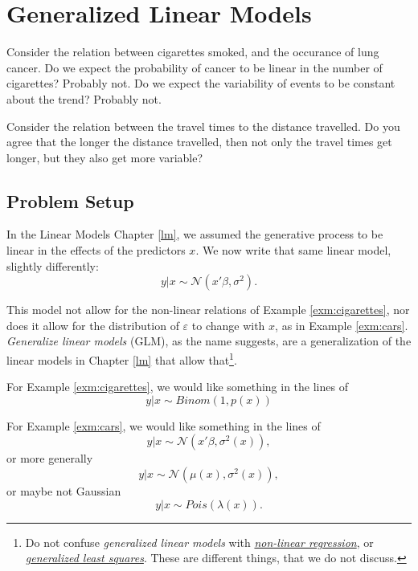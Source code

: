 \documentclass[]{book}
\theoremstyle{definition}
\theoremstyle{definition}
\theoremstyle{definition}
\theoremstyle{remark}
\let\BeginKnitrBlock\begin \let\EndKnitrBlock\end
\begin{document}
\chapter{Generalized Linear Models}\label{glm}

\BeginKnitrBlock{example}
\protect\hypertarget{exm:cigarettes}{}{\label{exm:cigarettes} }Consider the
relation between cigarettes smoked, and the occurance of lung cancer. Do
we expect the probability of cancer to be linear in the number of
cigarettes? Probably not. Do we expect the variability of events to be
constant about the trend? Probably not.
\EndKnitrBlock{example}

\BeginKnitrBlock{example}
\protect\hypertarget{exm:cars}{}{\label{exm:cars} }Consider the relation
between the travel times to the distance travelled. Do you agree that
the longer the distance travelled, then not only the travel times get
longer, but they also get more variable?
\EndKnitrBlock{example}

\section{Problem Setup}\label{problem-setup-1}

In the Linear Models Chapter \ref{lm}, we assumed the generative process
to be linear in the effects of the predictors \(x\). We now write that
same linear model, slightly differently: \[
 y|x \sim \mathcal{N}(x'\beta, \sigma^2).
\]

This model not allow for the non-linear relations of Example
\ref{exm:cigarettes}, nor does it allow for the distribution of
\(\varepsilon\) to change with \(x\), as in Example \ref{exm:cars}.
\emph{Generalize linear models} (GLM), as the name suggests, are a
generalization of the linear models in Chapter \ref{lm} that allow
that\footnote{Do not confuse \emph{generalized linear models} with
  \href{https://en.wikipedia.org/wiki/Nonlinear_regression}{\emph{non-linear
  regression}}, or
  \href{https://en.wikipedia.org/wiki/Generalized_least_squares}{\emph{generalized
  least squares}}. These are different things, that we do not discuss.}.

For Example \ref{exm:cigarettes}, we would like something in the lines
of \[
 y|x \sim Binom(1,p(x))
\]

For Example \ref{exm:cars}, we would like something in the lines of \[
 y|x \sim \mathcal{N}(x'\beta,\sigma^2(x)),
\] or more generally \[
 y|x \sim \mathcal{N}(\mu(x),\sigma^2(x)),
\] or maybe not Gaussian \[
 y|x \sim Pois(\lambda(x)).
\]
\end{document}
